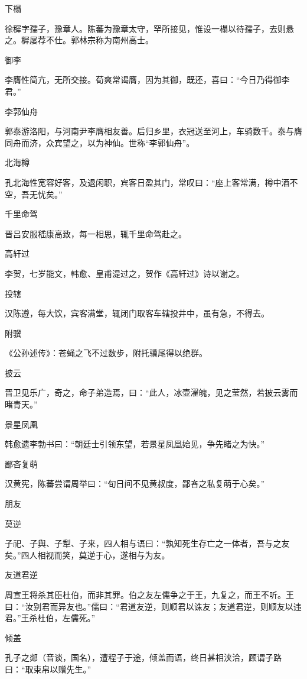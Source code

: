 \documentclass[a4paper,12pt,UTF8,twoside]{ctexbook}
\begin{document}
    下榻
    
    徐穉字孺子，豫章人。陈蕃为豫章太守，罕所接见，惟设一榻以待孺子，去则悬之。穉屡荐不仕。郭林宗称为南州高士。
    
    御李
    
    李膺性简亢，无所交接。荀爽常谒膺，因为其御，既还，喜曰：“今日乃得御李君。”
    
    李郭仙舟
    
    郭泰游洛阳，与河南尹李膺相友善。后归乡里，衣冠送至河上，车骑数千。泰与膺同舟而济，众宾望之，以为神仙。世称“李郭仙舟”。
    
    北海樽
    
    孔北海性宽容好客，及退闲职，宾客日盈其门，常叹曰：“座上客常满，樽中酒不空，吾无忧矣。”
    
    千里命驾
    
    晋吕安服嵇康高致，每一相思，辄千里命驾赴之。
    
    高轩过
    
    李贺，七岁能文，韩愈、皇甫湜过之，贺作《高轩过》诗以谢之。
    
    投辖
    
    汉陈遵，每大饮，宾客满堂，辄闭门取客车辖投井中，虽有急，不得去。
    
    附骥
    
    《公孙述传》：苍蝇之飞不过数步，附托骥尾得以绝群。
    
    披云
    
    晋卫见乐广，奇之，命子弟造焉，曰：“此人，冰壶濯魄，见之莹然，若披云雾而睹青天。”
    
    景星凤凰
    
    韩愈遗李勃书曰：“朝廷士引领东望，若景星凤凰始见，争先睹之为快。”
    
    鄙吝复萌
    
    汉黄宪，陈蕃尝谓周举曰：“旬日间不见黄叔度，鄙吝之私复萌于心矣。”
    
    朋友
    
    莫逆
    
    子祀、子舆、子犁、子来，四人相与语曰：“孰知死生存亡之一体者，吾与之友矣。”四人相视而笑，莫逆于心，遂相与为友。
    
    友道君逆
    
    周宣王将杀其臣杜伯，而非其罪。伯之友左儒争之于王，九复之，而王不听。王曰：“汝别君而异友也。”儒曰：“君道友逆，则顺君以诛友；友道君逆，则顺友以违君。”王杀杜伯，左儒死。”
    
    倾盖
    
    孔子之郯（音谈，国名），遭程子于途，倾盖而语，终日甚相浃洽，顾谓子路曰：“取束帛以赠先生。”
    
\end{document}
